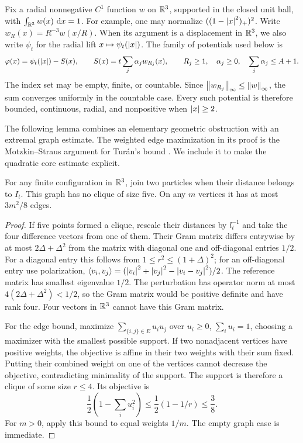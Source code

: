 Fix a radial nonnegative $C^1$ function $w$ on $\mathbb R^3$, supported in the
closed unit ball, with $\int_{\mathbb R^3}w(x)\,\,\mathrm d x=1$.  For example, one
may normalize $((1-\left|x\right|^2)_+)^2$.  Write
$w_R(x)=R^{-3}w(x/R)$.  When its argument is a displacement in $\mathbb R^3$,
we also write $\psi_t$ for the radial lift $x\mapsto\psi_t(\left|x\right|)$.
The family of potentials used below is
\begin{equation}\label{f:family}
 \varphi(x)=\psi_t(\left|x\right|)-S(x),\qquad
 S(x)=t\sum_j\alpha_j w_{R_j}(x),\qquad
 R_j\ge1,\quad \alpha_j\ge0,\quad \sum_j\alpha_j\le A+1.
\end{equation}
The index set may be empty, finite, or countable.  Since
$\left\lVert w_{R_j}\right\rVert_\infty\le\left\lVert w\right\rVert_\infty$, the sum converges
uniformly in the countable case.  Every such potential is therefore
bounded, continuous, radial, and nonpositive when $\left|x\right|\ge2$.

The following lemma combines an elementary geometric obstruction with
an extremal graph estimate.  The weighted edge maximization in its
proof is the Motzkin--Straus argument for Tur\'an's bound
\citep[Theorem~1]{MotzkinStraus1965}.  We include it to make the
quadratic core estimate explicit.

\begin{lemma}\label{f:shell-graph}
For any finite configuration in $\mathbb R^3$, join two particles when their
distance belongs to $I_t$.  This graph has no clique of size five.
On any $m$ vertices it has at most $3m^2/8$ edges.
\end{lemma}

\begin{proof}
If five points formed a clique, rescale their distances by $l_t^{-1}$
and take the four difference vectors from one of them.  Their Gram
matrix differs entrywise by at most $2\Delta+\Delta^2$ from the matrix
with diagonal one and off-diagonal entries $1/2$.  For a diagonal entry
this follows from $1\le r^2\le(1+\Delta)^2$; for an off-diagonal entry
use polarization,
$\left\langle v_i,v_j\right\rangle=(\left|v_i\right|^2+\left|v_j\right|^2-\left|v_i-v_j\right|^2)/2$.
The reference matrix has smallest eigenvalue $1/2$.  The perturbation
has operator norm at most $4(2\Delta+\Delta^2)<1/2$, so the Gram matrix
would be positive definite and have rank four.  Four vectors in
$\mathbb R^3$ cannot have this Gram matrix.

For the edge bound, maximize $\sum_{\{i,j\}\in E}u_i u_j$ over
$u_i\ge0$, $\sum_i u_i=1$, choosing a maximizer with the smallest
possible support.  If two nonadjacent vertices have positive weights,
the objective is affine in their two weights with their sum fixed.
Putting their combined weight on one of the vertices cannot decrease
the objective, contradicting minimality of the support.  The support
is therefore a clique of some size $r\le4$.  Its objective is
\[
 \frac12\left(1-\sum_i u_i^2\right)
 \le\frac12(1-1/r)\le\frac38.
\]
For $m>0$, apply this bound to equal weights $1/m$.  The empty graph
case is immediate.
\end{proof}


